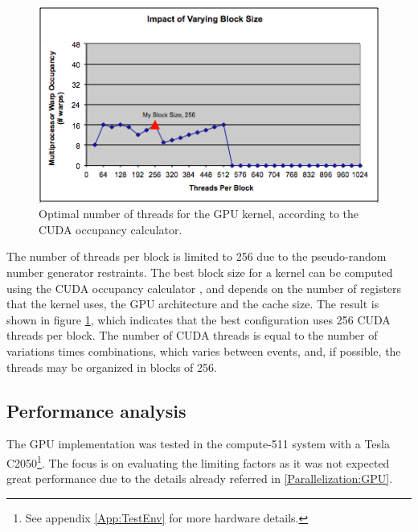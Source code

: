 \begin{figure}[!htp]
	\begin{center}
		\includegraphics[scale=0.6]{../../common/graphs/block_size_gpu.png}
		\caption{Optimal number of threads for the GPU kernel, according to the \nvidia CUDA occupancy calculator.}
		\label{fig:GPUCalc}
	\end{center}
\end{figure}

The number of threads per block is limited to 256 due to the pseudo-random number generator restraints. The best block size for a kernel can be computed using the \nvidia CUDA occupancy calculator \cite{NVIDIA:Calculator}, and depends on the number of registers that the kernel uses, the GPU architecture and the cache size. The result is shown in figure \ref{fig:GPUCalc}, which indicates that the best configuration uses 256 CUDA threads per block. The number of CUDA threads is equal to the number of variations times combinations, which varies between events, and, if possible, the threads may be organized in blocks of 256.

\subsection{Performance analysis}
\label{GPUPerformance}

The GPU implementation was tested in the compute-511 system with a \nvidia Tesla C2050\footnote{See appendix \ref{App:TestEnv} for more hardware details.}. The focus is on evaluating the limiting factors as it was not expected great performance due to the details already referred in \ref{Parallelization:GPU}.

